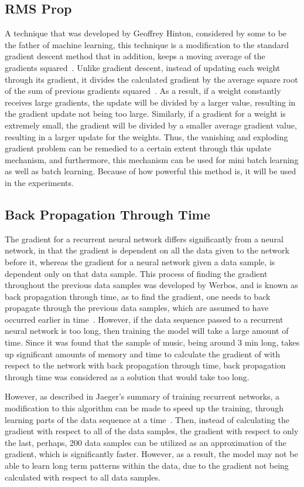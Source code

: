 \documentclass[12pt, titlepage]{article}
\begin{document}
\subsection{RMS Prop}
A technique that was developed by Geoffrey Hinton, considered by some to be the
father of machine learning, this technique is a modification to the standard
gradient descent method that in addition, keeps a moving average of the
gradients squared~\cite{rmsprop}. Unlike gradient descent, instead of updating
each weight through its gradient, it divides the calculated gradient by the
average square root of the sum of previous gradients squared~\cite{rmsprop}. As
a result, if a weight constantly receives large gradients, the update will be
divided by a larger value, resulting in the gradient update not being too large.
Similarly, if a gradient for a weight is extremely small, the gradient will be
divided by a smaller average gradient value, resulting in a larger update for
the weights. Thus, the vanishing and exploding gradient problem can be remedied
to a certain extent through this update mechanism, and furthermore, this
mechanism can be used for mini batch learning as well as batch learning. Because
of how powerful this method is, it will be used in the experiments.

\subsection{Back Propagation Through Time}
The gradient for a recurrent neural network differs significantly from a neural
network, in that the gradient is dependent on all the data given to the network
before it, whereas the gradient for a neural network given a data sample, is
dependent only on that data sample. This process of finding the gradient
throughout the previous data samples was developed by Werbos, and is known as
back propagation through time, as to find the gradient, one needs to back
propagate through the previous data samples, which are assumed to have occurred
earlier in time~\cite{bptt}. However, if the data sequence passed to a recurrent
neural network is too long, then training the model will take a large amount of
time. Since it was found that the sample of music, being around 3 min long,
takes up significant amounts of memory and time to calculate the
gradient of with respect to the network with back propagation through time,
back propagation through time was considered as a solution that would take too
long.

However, as described in Jaeger's summary of training recurrent networks, a
modification to this algorithm can be made to speed up the training, through
learning parts of the data sequence at a time~\cite{rnntrain}. Then, instead of
calculating the gradient with respect to all of the data samples, the gradient
with respect to only the last, perhaps, 200 data samples can be utilized as an
approximation of the gradient, which is significantly faster. However, as a
result, the model may not be able to learn long term patterns within the data,
due to the gradient not being calculated with respect to all data samples.
\end{document}
